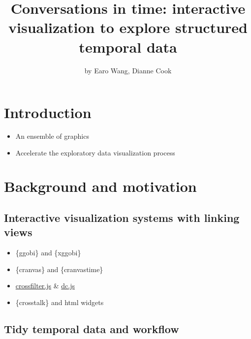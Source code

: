 \title{Conversations in time: interactive visualization to explore structured
temporal data}
\author{by Earo Wang, Dianne Cook}

\maketitle


\hypertarget{introduction}{%
\section{Introduction}\label{introduction}}

\begin{itemize}
\tightlist
\item
  An ensemble of graphics
\item
  Accelerate the exploratory data visualization process
\end{itemize}

\hypertarget{background-and-motivation}{%
\section{Background and motivation}\label{background-and-motivation}}

\hypertarget{interactive-visualization-systems-with-linking-views}{%
\subsection{Interactive visualization systems with linking
views}\label{interactive-visualization-systems-with-linking-views}}

\begin{itemize}
\tightlist
\item
  \{ggobi\} and \{xggobi\}
\item
  \{cranvas\} and \{cranvastime\}
\item
  \href{http://crossfilter.github.io/crossfilter/}{crossfilter.js} \&
  \href{https://dc-js.github.io/dc.js/}{dc.js}
\item
  \{crosstalk\} and html widgets
\end{itemize}

\hypertarget{tidy-temporal-data-and-workflow}{%
\subsection{Tidy temporal data and
workflow}\label{tidy-temporal-data-and-workflow}}

